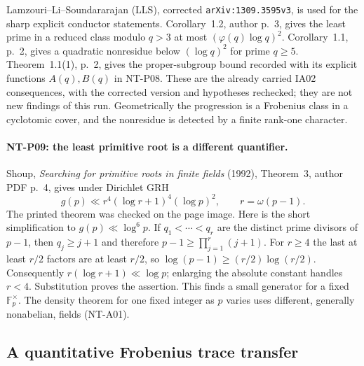 Lamzouri--Li--Soundararajan (LLS), corrected
\texttt{arXiv:1309.3595v3}, is used for the sharp explicit conductor
statements.  Corollary~1.2, author p.~3, gives the least prime in a reduced
class modulo $q>3$ at most $(\varphi(q)\log q)^2$.
Corollary~1.1, p.~2, gives a quadratic nonresidue below $(\log q)^2$ for
prime $q\ge5$.  Theorem~1.1(1), p.~2, gives the proper-subgroup bound
recorded with its explicit functions $A(q),B(q)$ in NT-P08.
These are the already carried IA02 consequences, with the corrected
version and hypotheses rechecked; they are not new findings of this run.
Geometrically the progression is a Frobenius class in a cyclotomic cover,
and the nonresidue is detected by a finite rank-one character.

\paragraph{NT-P09: the least primitive root is a different quantifier.}
Shoup, \emph{Searching for primitive roots in finite fields} (1992),
Theorem~3, author PDF p.~4, gives under Dirichlet GRH
\[
 g(p)\ll r^4(\log r+1)^4(\log p)^2,
 \qquad r=\omega(p-1).
\]
The printed theorem was checked on the page image.  Here is the short
simplification to $g(p)\ll\log^6p$.  If $q_1<\cdots<q_r$ are the distinct
prime divisors of $p-1$, then $q_j\ge j+1$ and therefore
$p-1\ge\prod_{j=1}^r(j+1)$.  For $r\ge4$ the last at least $r/2$ factors
are at least $r/2$, so
$\log(p-1)\ge(r/2)\log(r/2)$.  Consequently
$r(\log r+1)\ll\log p$; enlarging the absolute constant handles $r<4$.
Substitution proves the assertion.  This finds a small generator for a
fixed $\mathbb F_p^\times$.  The density theorem for one fixed integer
as $p$ varies uses different, generally nonabelian, fields (NT-A01).

\subsection{A quantitative Frobenius trace transfer}

